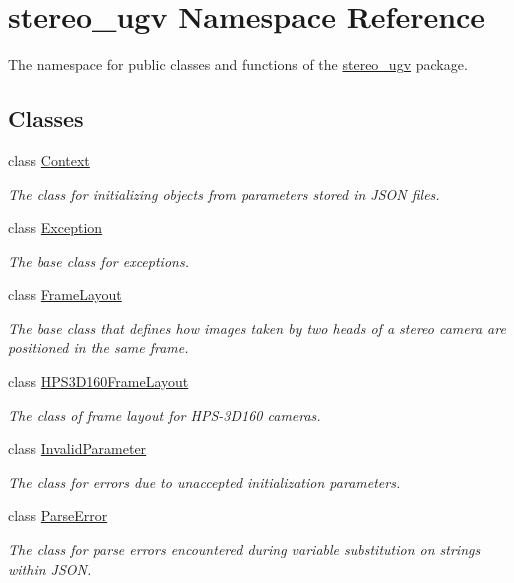 \hypertarget{namespacestereo__ugv}{}\section{stereo\+\_\+ugv Namespace Reference}
\label{namespacestereo__ugv}


The namespace for public classes and functions of the \hyperlink{namespacestereo__ugv}{stereo\+\_\+ugv} package.  


\subsection*{Classes}
\begin{DoxyCompactItemize}
\item 
class \hyperlink{classstereo__ugv_1_1Context}{Context}
\begin{DoxyCompactList}\small\item\em The class for initializing objects from parameters stored in J\+S\+ON files. \end{DoxyCompactList}\item 
class \hyperlink{classstereo__ugv_1_1Exception}{Exception}
\begin{DoxyCompactList}\small\item\em The base class for exceptions. \end{DoxyCompactList}\item 
class \hyperlink{classstereo__ugv_1_1FrameLayout}{Frame\+Layout}
\begin{DoxyCompactList}\small\item\em The base class that defines how images taken by two heads of a stereo camera are positioned in the same frame. \end{DoxyCompactList}\item 
class \hyperlink{classstereo__ugv_1_1HPS3D160FrameLayout}{H\+P\+S3\+D160\+Frame\+Layout}
\begin{DoxyCompactList}\small\item\em The class of frame layout for H\+P\+S-\/3\+D160 cameras. \end{DoxyCompactList}\item 
class \hyperlink{classstereo__ugv_1_1InvalidParameter}{Invalid\+Parameter}
\begin{DoxyCompactList}\small\item\em The class for errors due to unaccepted initialization parameters. \end{DoxyCompactList}\item 
class \hyperlink{classstereo__ugv_1_1ParseError}{Parse\+Error}
\begin{DoxyCompactList}\small\item\em The class for parse errors encountered during variable substitution on strings within J\+S\+ON. \end{DoxyCompactList}\end{DoxyCompactItemize}
